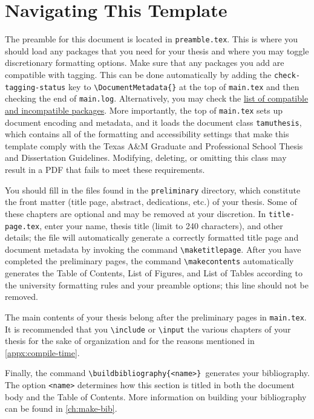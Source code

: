 \section{Navigating This Template}
The preamble for this document is located in \texttt{preamble.tex}.
This is where you should load any packages that you need for your thesis and where you may toggle discretionary formatting options.
Make sure that any packages you add are compatible with tagging.
This can be done automatically by adding the \texttt{check-tagging-status} key to \texttt{\backslash DocumentMetadata\{\}} at the top of \texttt{main.tex} and then checking the end of \texttt{main.log}.
Alternatively, you may check the \href{https://latex3.github.io/tagging-project/tagging-status/}{list of compatible and incompatible packages}.
More importantly, the top of \texttt{main.tex} sets up document encoding and metadata, and it loads the document class \texttt{tamuthesis}, which contains all of the formatting and accessibility settings that make this template comply with the Texas A\&M Graduate and Professional School Thesis and Dissertation Guidelines.
Modifying, deleting, or omitting this class may result in a PDF that fails to meet these requirements.

You should fill in the files found in the \texttt{preliminary} directory, which constitute the front matter (title page, abstract, dedications, etc.) of your thesis.
Some of these chapters are optional and may be removed at your discretion.
In \texttt{title-page.tex}, enter your name, thesis title (limit to 240 characters), and other details; the file will automatically generate a correctly formatted title page and document metadata by invoking the command \texttt{\backslash maketitlepage}.
After you have completed the preliminary pages, the command \texttt{\backslash makecontents} automatically generates the Table of Contents, List of Figures, and List of Tables according to the university formatting rules and your preamble options; this line should not be removed.

The main contents of your thesis belong after the preliminary pages in \texttt{main.tex}.
It is recommended that you \texttt{\backslash include} or \texttt{\backslash input} the various chapters of your thesis for the sake of organization and for the reasons mentioned in \ref{appx:compile-time}.

Finally, the command \texttt{\backslash buildbibliography\{<name>\}}\ generates your bibliography.
The option \texttt{<name>} determines how this section is titled in both the document body and the Table of Contents.
More information on building your bibliography can be found in \autoref{ch:make-bib}.


